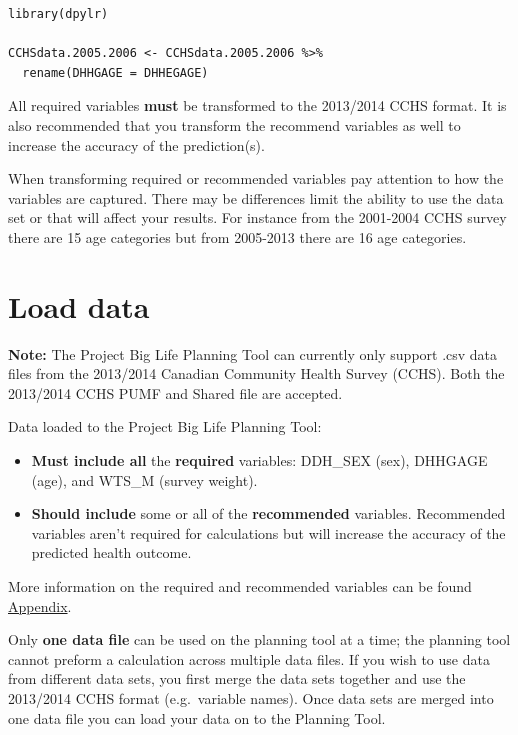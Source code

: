 \documentclass[]{book}
\begin{document}
\begin{verbatim}
library(dpylr)

CCHSdata.2005.2006 <- CCHSdata.2005.2006 %>% 
  rename(DHHGAGE = DHHEGAGE)
\end{verbatim}

All required variables \textbf{must} be transformed to the 2013/2014
CCHS format. It is also recommended that you transform the recommend
variables as well to increase the accuracy of the prediction(s).

When transforming required or recommended variables pay attention to how
the variables are captured. There may be differences limit the ability
to use the data set or that will affect your results. For instance from
the 2001-2004 CCHS survey there are 15 age categories but from 2005-2013
there are 16 age categories.

\section{Load data}\label{load-data}

\textbf{Note:} The Project Big Life Planning Tool can currently only
support .csv data files from the 2013/2014 Canadian Community Health
Survey (CCHS). Both the 2013/2014 CCHS PUMF and Shared file are
accepted.

Data loaded to the Project Big Life Planning Tool:

\begin{itemize}
\item
  \textbf{Must include all} the \textbf{required} variables: DDH\_SEX
  (sex), DHHGAGE (age), and WTS\_M (survey weight).
\item
  \textbf{Should include} some or all of the \textbf{recommended}
  variables. Recommended variables aren't required for calculations but
  will increase the accuracy of the predicted health outcome.
\end{itemize}

More information on the required and recommended variables can be found
\protect\hyperlink{mport}{Appendix}.

Only \textbf{one data file} can be used on the planning tool at a time;
the planning tool cannot preform a calculation across multiple data
files. If you wish to use data from different data sets, you first merge
the data sets together and use the 2013/2014 CCHS format (e.g.~variable
names). Once data sets are merged into one data file you can load your
data on to the Planning Tool.
\end{document}
